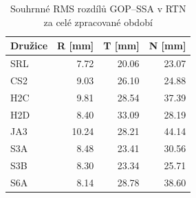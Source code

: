 \begin{table}[H]
\centering
\small
\caption{Souhrnné RMS rozdílů GOP--SSA v RTN za celé zpracované období}
\label{tab:gop_vs_ssa_satellites_doy001-doy030_hermite_rms}
\begin{tabular}{lrrr}
\toprule
Družice & R [mm] & T [mm] & N [mm] \\
\midrule
SRL & 7.72 & 20.06 & 23.07 \\
CS2 & 9.03 & 26.10 & 24.88 \\
H2C & 9.81 & 28.54 & 37.39 \\
H2D & 8.40 & 33.09 & 28.19 \\
JA3 & 10.24 & 28.21 & 44.14 \\
S3A & 8.48 & 23.41 & 30.56 \\
S3B & 8.30 & 23.34 & 25.71 \\
S6A & 8.14 & 28.78 & 38.60 \\
\bottomrule
\end{tabular}
\end{table}
